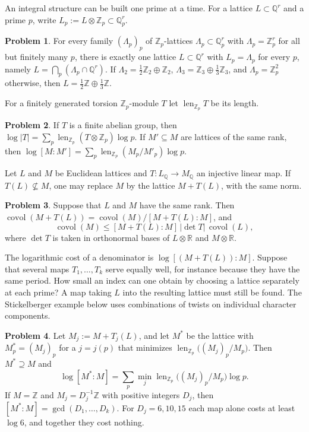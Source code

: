 \documentclass[reqno]{amsart}
\theoremstyle{definition}
\newtheorem{problem}{Problem}[section]
\theoremstyle{plain}
\newcommand{\Z}{\mathbb{Z}}
\newcommand{\Q}{\mathbb{Q}}
\newcommand{\R}{\mathbb{R}}
\newcommand{\len}{\operatorname{len}}
\begin{document}
An integral structure can be built one prime at a time.  For a lattice \(L \subset \Q^r\) and a prime \(p\), write \(L_p := L \otimes \Z_p \subset \Q_p^r\).

\begin{problem}\label{pr:local-global}
For every family \((\Lambda_p)_p\) of \(\Z_p\)-lattices \(\Lambda_p \subset \Q_p^r\) with \(\Lambda_p = \Z_p^r\) for all but finitely many \(p\), there is exactly one lattice \(L \subset \Q^r\) with \(L_p = \Lambda_p\) for every \(p\), namely \(L = \bigcap_p (\Lambda_p \cap \Q^r)\).  If \(\Lambda_2 = \tfrac12 \Z_2 \oplus \Z_2\), \(\Lambda_3 = \Z_3 \oplus \tfrac13 \Z_3\), and \(\Lambda_p = \Z_p^2\) otherwise, then \(L = \tfrac12\Z \oplus \tfrac13\Z\).
\end{problem}

For a finitely generated torsion \(\Z_p\)-module \(T\) let \(\len_{\Z_p} T\) be its length.

\begin{problem}\label{pr:length}
If \(T\) is a finite abelian group, then \(\log \lvert T \rvert = \sum_p \len_{\Z_p}(T \otimes \Z_p) \log p\).  If \(M' \subseteq M\) are lattices of the same rank, then \(\log [M : M'] = \sum_p \len_{\Z_p}(M_p/M'_p) \log p\).
\end{problem}

Let \(L\) and \(M\) be Euclidean lattices and \(T \colon L_\Q \to M_\Q\) an injective linear map.  If \(T(L) \not\subseteq M\), one may replace \(M\) by the lattice \(M + T(L)\), with the same norm.

\begin{problem}\label{pr:enlarge}
Suppose that \(L\) and \(M\) have the same rank.  Then \(\operatorname{covol}(M + T(L)) = \operatorname{covol}(M)/[M + T(L) : M]\), and
\[
  \operatorname{covol}(M) \le [M + T(L) : M]\, \lvert\det T\rvert\, \operatorname{covol}(L),
\]
where \(\det T\) is taken in orthonormal bases of \(L \otimes \R\) and \(M \otimes \R\).
\end{problem}

The logarithmic cost of a denominator is \(\log[(M+T(L)):M]\).  Suppose that several maps \(T_1,\ldots,T_k\) serve equally well, for instance because they have the same period.  How small an index can one obtain by choosing a lattice separately at each prime?  A map taking \(L\) into the resulting lattice must still be found.  The Stickelberger example below uses combinations of twists on individual character components.

\begin{problem}\label{pr:gcd}
Let \(M_j := M + T_j(L)\), and let \(M^*\) be the lattice with \(M^*_p = (M_j)_p\) for a \(j = j(p)\) that minimizes \(\len_{\Z_p}\bigl((M_j)_p/M_p\bigr)\).  Then \(M^* \supseteq M\) and
\[
  \log [M^* : M] = \sum_p \min_j \len_{\Z_p}\bigl((M_j)_p/M_p\bigr) \log p .
\]
If \(M = \Z\) and \(M_j = D_j^{-1}\Z\) with positive integers \(D_j\), then \([M^* : M] = \gcd(D_1, \dots, D_k)\).  For \(D_j = 6, 10, 15\) each map alone costs at least \(\log 6\), and together they cost nothing.
\end{problem}
\end{document}
